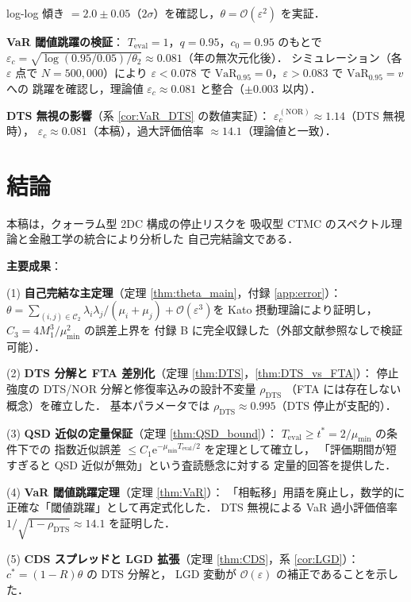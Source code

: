 \documentclass[12pt,a4paper]{article}
\theoremstyle{plain}
\theoremstyle{definition}
\theoremstyle{remark}
\newcommand{\calO}{\mathcal{O}}
\newcommand{\eps}{\varepsilon}
\newcommand{\e}{\mathrm{e}}
\newcommand{\VaR}{\mathrm{VaR}}
\newcommand{\calCtwo}{\mathcal{C}_2}
\newcommand{\rhoDTS}{\rho_{\mathrm{DTS}}}
\newcommand{\Teval}{T_{\mathrm{eval}}}
\begin{document}
log-log 傾き $=2.0\pm0.05$（$2\sigma$）を確認し，$\theta=\calO(\eps^2)$ を実証．

\textbf{VaR 閾値跳躍の検証}：
$\Teval=1$，$q=0.95$，$c_0=0.95$ のもとで
$\eps_c = \sqrt{\log(0.95/0.05)/\theta_2}\approx0.081$（年の無次元化後）．
シミュレーション（各 $\eps$ 点で $N=500{,}000$）により
$\eps<0.078$ で $\VaR_{0.95}=0$，$\eps>0.083$ で $\VaR_{0.95}=v$ への
跳躍を確認し，理論値 $\eps_c\approx0.081$ と整合（$\pm0.003$ 以内）．

\textbf{DTS 無視の影響}（系 \ref{cor:VaR_DTS} の数値実証）：
$\eps_c^{(\mathrm{NOR})}\approx1.14$（DTS 無視時），
$\eps_c\approx0.081$（本稿），過大評価倍率 $\approx14.1$（理論値と一致）．

\section{結論}\label{sec:conclusion}

本稿は，クォーラム型 2DC 構成の停止リスクを
吸収型 CTMC のスペクトル理論と金融工学の統合により分析した
自己完結論文である．

\textbf{主要成果}：

(1) \textbf{自己完結な主定理}（定理 \ref{thm:theta_main}，付録 \ref{app:error}）：
$\theta = \sum_{(i,j)\in\calCtwo}\lambda_i\lambda_j/(\mu_i+\mu_j)+\calO(\eps^3)$を
Kato 摂動理論により証明し，$C_3=4M_1^3/\mu_{\min}^2$ の誤差上界を
付録 B に完全収録した（外部文献参照なしで検証可能）．

(2) \textbf{DTS 分解と FTA 差別化}（定理 \ref{thm:DTS}，\ref{thm:DTS_vs_FTA}）：
停止強度の DTS/NOR 分解と修復率込みの設計不変量 $\rhoDTS$
（FTA には存在しない概念）を確立した．
基本パラメータでは $\rhoDTS\approx0.995$（DTS 停止が支配的）．

(3) \textbf{QSD 近似の定量保証}（定理 \ref{thm:QSD_bound}）：
$\Teval\ge t^*=2/\mu_{\min}$ の条件下での
指数近似誤差 $\le C_1\e^{-\mu_{\min}\Teval/2}$ を定理として確立し，
「評価期間が短すぎると QSD 近似が無効」という査読懸念に対する
定量的回答を提供した．

(4) \textbf{VaR 閾値跳躍定理}（定理 \ref{thm:VaR}）：
「相転移」用語を廃止し，数学的に正確な「閾値跳躍」として再定式化した．
DTS 無視による VaR 過小評価倍率 $1/\sqrt{1-\rhoDTS}\approx14.1$ を証明した．

(5) \textbf{CDS スプレッドと LGD 拡張}（定理 \ref{thm:CDS}，系 \ref{cor:LGD}）：
$c^*=(1-R)\theta$ の DTS 分解と，
LGD 変動が $\calO(\eps)$ の補正であることを示した．
\end{document}
